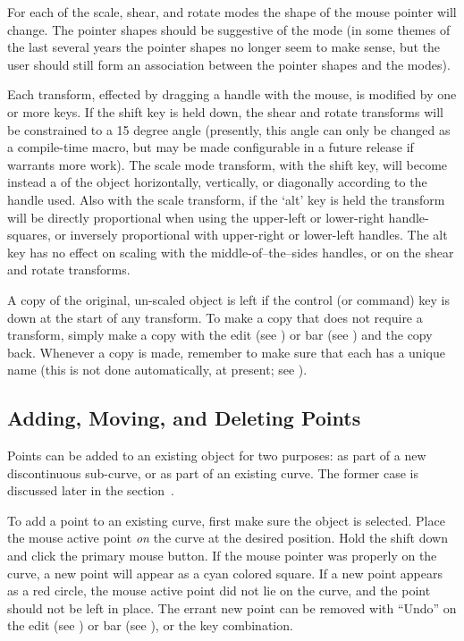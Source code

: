 		For each of the
		scale, shear, and rotate modes the shape of the
		mouse pointer will change. The pointer shapes
		should be suggestive of the mode (in some
		 themes of the last several years the
		pointer shapes no longer seem to make sense, but the
		user should still form an association between the
		pointer shapes and the modes).
		
		Each transform, effected by dragging a handle with the
		mouse, is modified by one or more keys.	If the shift
		key is held down, the shear and rotate transforms
		will be constrained to a 15 degree angle (presently,
		this angle can only be changed as a compile-time
		macro, but may be made configurable
		in a future release if \IXpkg{} warrants more work).
		The scale mode transform, with the shift key, will become
		instead a  of the object horizontally,
		vertically, or diagonally according to the handle
		used. Also with the scale transform, if the `alt'
		key is held the transform will be directly proportional
		when using the upper-left or lower-right handle-squares,
		or inversely proportional with upper-right or
		lower-left handles. The alt key has no effect on
		scaling with the middle-of--the--sides handles, or on
		the shear and rotate transforms.
		
		A copy of the original, un-scaled object is left
		if the control (or command) key is down
		at the start of any transform. To make a copy that
		does not require a transform, simply make a
		 copy with the edit 
		(see ) or  bar
		(see ) and
		 the copy back. Whenever a copy is
		made, remember to make sure that each has a unique
		name (this is not done automatically, at present;
		see ).
		
		\subsection{Adding, Moving, and Deleting Points}%
		\label{ssec:add_del_points}
		Points can be added to an existing object
		for two purposes:
		as part of a new discontinuous sub-curve, or as
		part of an existing curve. The former case is
		discussed later in the
		section~.
		
		To add a point to an existing curve, first make sure
		the object is selected. Place the mouse active point
		\emph{on} the curve at the desired position.
		Hold the shift  down and click the
		primary mouse button. If the mouse pointer was
		properly on the curve, a new point will appear as a
		cyan colored square. If a new point appears as
		a red circle, the mouse active point did not lie on the
		curve, and the point should not be left in place.
		The errant new point can be removed with
		``Undo'' on the edit 
		(see ) or  bar
		(see ),
		or the  key combination.
		
